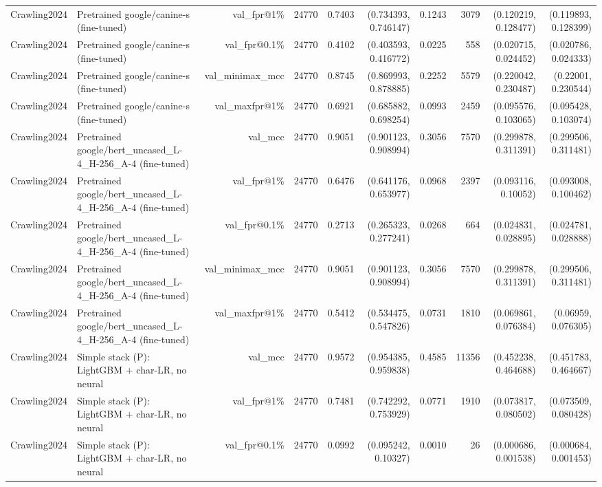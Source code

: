 \begin{table}[t]
\begin{tabular}{llrrrrrrrr}
Crawling2024 & Pretrained google/canine-s (fine-tuned) & val\_fpr@1\% & 24770 & 0.7403 & (0.734393, 0.746147) & 0.1243 & 3079 & (0.120219, 0.128477) & (0.119893, 0.128399) \\
Crawling2024 & Pretrained google/canine-s (fine-tuned) & val\_fpr@0.1\% & 24770 & 0.4102 & (0.403593, 0.416772) & 0.0225 & 558 & (0.020715, 0.024452) & (0.020786, 0.024333) \\
Crawling2024 & Pretrained google/canine-s (fine-tuned) & val\_minimax\_mcc & 24770 & 0.8745 & (0.869993, 0.878885) & 0.2252 & 5579 & (0.220042, 0.230487) & (0.22001, 0.230544) \\
Crawling2024 & Pretrained google/canine-s (fine-tuned) & val\_maxfpr@1\% & 24770 & 0.6921 & (0.685882, 0.698254) & 0.0993 & 2459 & (0.095576, 0.103065) & (0.095428, 0.103074) \\
Crawling2024 & Pretrained google/bert\_uncased\_L-4\_H-256\_A-4 (fine-tuned) & val\_mcc & 24770 & 0.9051 & (0.901123, 0.908994) & 0.3056 & 7570 & (0.299878, 0.311391) & (0.299506, 0.311481) \\
Crawling2024 & Pretrained google/bert\_uncased\_L-4\_H-256\_A-4 (fine-tuned) & val\_fpr@1\% & 24770 & 0.6476 & (0.641176, 0.653977) & 0.0968 & 2397 & (0.093116, 0.10052) & (0.093008, 0.100462) \\
Crawling2024 & Pretrained google/bert\_uncased\_L-4\_H-256\_A-4 (fine-tuned) & val\_fpr@0.1\% & 24770 & 0.2713 & (0.265323, 0.277241) & 0.0268 & 664 & (0.024831, 0.028895) & (0.024781, 0.028888) \\
Crawling2024 & Pretrained google/bert\_uncased\_L-4\_H-256\_A-4 (fine-tuned) & val\_minimax\_mcc & 24770 & 0.9051 & (0.901123, 0.908994) & 0.3056 & 7570 & (0.299878, 0.311391) & (0.299506, 0.311481) \\
Crawling2024 & Pretrained google/bert\_uncased\_L-4\_H-256\_A-4 (fine-tuned) & val\_maxfpr@1\% & 24770 & 0.5412 & (0.534475, 0.547826) & 0.0731 & 1810 & (0.069861, 0.076384) & (0.06959, 0.076305) \\
Crawling2024 & Simple stack (P): LightGBM + char-LR, no neural & val\_mcc & 24770 & 0.9572 & (0.954385, 0.959838) & 0.4585 & 11356 & (0.452238, 0.464688) & (0.451783, 0.464667) \\
Crawling2024 & Simple stack (P): LightGBM + char-LR, no neural & val\_fpr@1\% & 24770 & 0.7481 & (0.742292, 0.753929) & 0.0771 & 1910 & (0.073817, 0.080502) & (0.073509, 0.080428) \\
Crawling2024 & Simple stack (P): LightGBM + char-LR, no neural & val\_fpr@0.1\% & 24770 & 0.0992 & (0.095242, 0.10327) & 0.0010 & 26 & (0.000686, 0.001538) & (0.000684, 0.001453) \\

\end{tabular}
\end{table}
